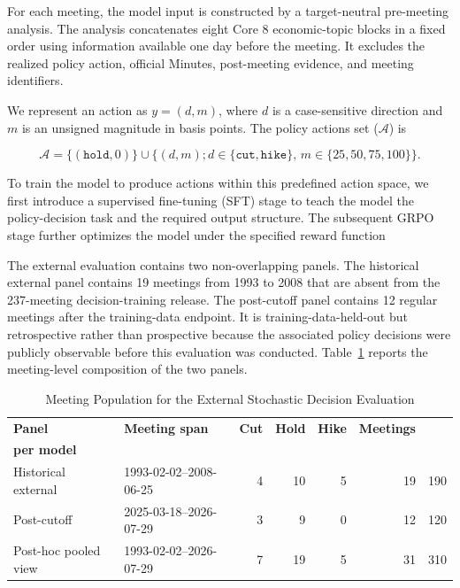 For each meeting, the model input is constructed by a target-neutral pre-meeting analysis. The analysis concatenates eight Core 8 economic-topic blocks in a fixed order using information available one day before the meeting. It excludes the realized policy action, official Minutes, post-meeting evidence, and meeting identifiers.

We represent an action as $y=(d,m)$, where $d$ is a case-sensitive direction and $m$ is an unsigned magnitude in basis points. The policy actions set ($\mathcal{A}$) is

\begin{equation*}
    \mathcal{A} = \{(\texttt{hold},0)\} \cup \{(d,m); d\in\{\texttt{cut},\texttt{hike}\},\, m\in\{25,50,75,100\}\}.
\end{equation*}

To train the model to produce actions within this predefined action space, we first introduce a supervised fine-tuning (SFT) stage to teach the model the policy-decision task and the required output structure. The subsequent GRPO stage further optimizes the model under the specified reward function

The external evaluation contains two non-overlapping panels. The historical external panel contains 19 meetings from 1993 to 2008 that are absent from the 237-meeting decision-training release. The post-cutoff panel contains 12 regular meetings after the training-data endpoint. It is training-data-held-out but retrospective rather than prospective because the associated policy decisions were publicly observable before this evaluation was conducted. Table~\ref{tab:ch2:decision_external_population} reports the meeting-level composition of the two panels.

\begin{table}[H]
    \centering
    \footnotesize
    \setlength{\tabcolsep}{4pt}
    \renewcommand{\arraystretch}{1.12}
    \begin{threeparttable}
    \caption{Meeting Population for the External Stochastic Decision Evaluation}
    \label{tab:ch2:decision_external_population}

    \begin{tabular}{l l r r r r r}
        \toprule
        \textbf{Panel}
        & \textbf{Meeting span}
        & \textbf{Cut}
        & \textbf{Hold}
        & \textbf{Hike}
        & \textbf{Meetings}
        & \makecell{\textbf{Generations}\\\textbf{per model}} \\
        \midrule
        Historical external
        & 1993-02-02--2008-06-25
        & 4 & 10 & 5 & 19 & 190 \\

        Post-cutoff
        & 2025-03-18--2026-07-29
        & 3 & 9 & 0 & 12 & 120 \\

        \midrule
        Post-hoc pooled view
        & 1993-02-02--2026-07-29
        & 7 & 19 & 5 & 31 & 310 \\
        \bottomrule
    \end{tabular}
    \end{threeparttable}
\end{table}

